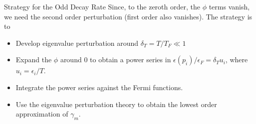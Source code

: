 \begin{frame}{Strategy for the Odd Decay Rate}
  Since, to the zeroth order, the \(\phi\) terms vanish, we need the second order perturbation (first order also vanishes). The strategy is to
  \begin{itemize}
    \item Develop eigenvalue perturbation around \(\delta_T=T/T_F \ll 1\)
    \item Expand the \(\phi\) around \(0\) to obtain a power series in \(\epsilon(p_i)/\epsilon_F = \delta_Tu_i\), where \(u_i=\epsilon_i/T\).
    \item Integrate the power series against the Fermi functions.
    \item Use the eigenvalue perturbation theory to obtain the lowest order approximation of $\gamma_m$.
  \end{itemize}
\end{frame}
